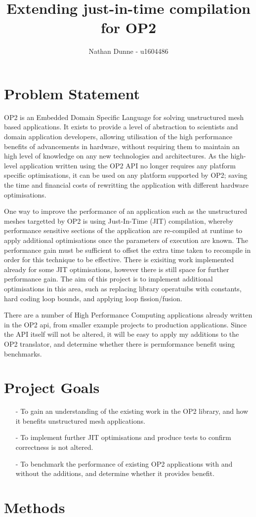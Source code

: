 \documentclass[11pt]{article}
\title{Extending just-in-time compilation for OP2}
\author{Nathan Dunne - u1604486}
\begin{document}
\maketitle
\section*{Problem Statement}
OP2 is an Embedded Domain Specific Language for solving unstructured mesh based applications. It exists to provide a level of abstraction to scientists and domain application developers, allowing utilisation of the high performance benefits of advancements in hardware, without requiring them to maintain an high level of knowledge on any new technologies and architectures. As the high-level application written using the OP2 API no longer requires any platform specific optimisations, it can be used on any platform supported by OP2; saving the time and financial costs of rewritting the application with different hardware optimisations.
\newline
\par
One way to improve the performance of an application such as the unstructured meshes targetted by OP2 is using Just-In-Time (JIT) compilation, whereby performance sensitive sections of the application are re-compiled at runtime to apply additional optimisations once the parameters of execution are known. The performance gain must be sufficient to offset the extra time taken to recompile in order for this technique to be effective. There is exisiting work implemented already for some JIT optimisations, however there is still space for further performance gain. The aim of this project is to implement additional optimisations in this area, such as replacing library operatuibs with constants, hard coding loop bounds, and applying loop fission/fusion.
\newline
\par
There are a number of High Performance Computing applications already written in the OP2 api, from smaller example projects to production applications. Since the API itself will not be altered, it will be easy to apply my additions to the OP2 translator, and determine whether there is permformance benefit using benchmarks. 

\section*{Project Goals}
 \begin{itemize}
  \item[-]{To gain an understanding of the existing work in the OP2 library, and how it benefits unstructured mesh applications.}
  \item[-]{To implement further JIT optimisations and produce tests to confirm correctness is not altered.}
  \item[-]{To benchmark the performance of existing OP2 applications with and without the additions, and determine whether it provides benefit.}
 \end{itemize}
\section*{Methods}
\end{document}
